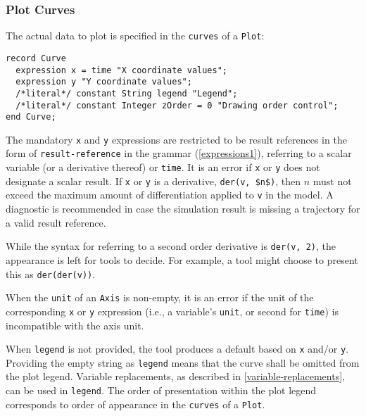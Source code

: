 \subsubsection{Plot Curves}\label{plot-curves}

The actual data to plot is specified in the \lstinline!curves! of a \lstinline!Plot!:
\begin{lstlisting}[language=modelica]
record Curve
  expression x = time "X coordinate values";
  expression y "Y coordinate values";
  /*literal*/ constant String legend "Legend";
  /*literal*/ constant Integer zOrder = 0 "Drawing order control";
end Curve;
\end{lstlisting}

The mandatory \lstinline!x! and \lstinline!y! expressions are restricted to be result references in the form of \lstinline[language=grammar]!result-reference! in the grammar (\cref{expressions1}), referring to a scalar variable (or a derivative thereof) or \lstinline!time!.
It is an error if \lstinline!x! or \lstinline!y! does not designate a scalar result.
If \lstinline!x! or \lstinline!y! is a derivative, \lstinline!der(v, $n$)!, then $n$ must not exceed the maximum amount of differentiation applied to \lstinline!v! in the model.
A diagnostic is recommended in case the simulation result is missing a trajectory for a valid result reference.

\begin{nonnormative}
While the syntax for referring to a second order derivative is \lstinline!der(v, 2)!, the appearance is left for tools to decide.
For example, a tool might choose to present this as \lstinline!der(der(v))!.
\end{nonnormative}

When the \lstinline!unit! of an \lstinline!Axis! is non-empty, it is an error if the unit of the corresponding \lstinline!x! or \lstinline!y! expression (i.e., a variable's \lstinline!unit!, or second for \lstinline!time!) is incompatible with the axis unit.

When \lstinline!legend! is not provided, the tool produces a default based on \lstinline!x! and/or \lstinline!y!.
Providing the empty string as \lstinline!legend! means that the curve shall be omitted from the plot legend.
Variable replacements, as described in \cref{variable-replacements}, can be used in \lstinline!legend!.
The order of presentation within the plot legend corresponds to order of appearance in the \lstinline!curves! of a \lstinline!Plot!.

